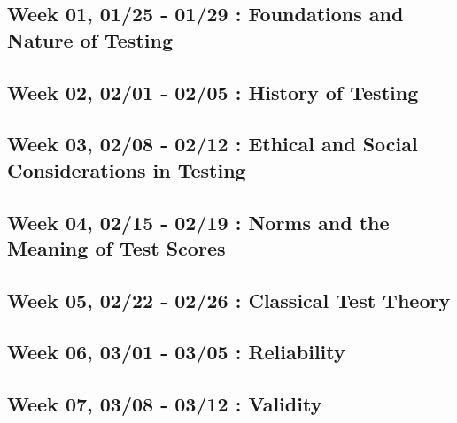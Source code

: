 \documentclass[11pt,]{article}
\begin{document}
\hypertarget{week-01-0125---0129-foundations-and-nature-of-testing}{%
\subsection{Week 01, 01/25 - 01/29 : Foundations and Nature of
Testing}\label{week-01-0125---0129-foundations-and-nature-of-testing}}

\hypertarget{week-02-0201---0205-history-of-testing}{%
\subsection{Week 02, 02/01 - 02/05 : History of
Testing}\label{week-02-0201---0205-history-of-testing}}

\hypertarget{week-03-0208---0212-ethical-and-social-considerations-in-testing}{%
\subsection{Week 03, 02/08 - 02/12 : Ethical and Social Considerations
in
Testing}\label{week-03-0208---0212-ethical-and-social-considerations-in-testing}}

\hypertarget{week-04-0215---0219-norms-and-the-meaning-of-test-scores}{%
\subsection{Week 04, 02/15 - 02/19 : Norms and the Meaning of Test
Scores}\label{week-04-0215---0219-norms-and-the-meaning-of-test-scores}}

\hypertarget{week-05-0222---0226-classical-test-theory}{%
\subsection{Week 05, 02/22 - 02/26 : Classical Test
Theory}\label{week-05-0222---0226-classical-test-theory}}

\hypertarget{week-06-0301---0305-reliability}{%
\subsection{Week 06, 03/01 - 03/05 :
Reliability}\label{week-06-0301---0305-reliability}}

\hypertarget{week-07-0308---0312-validity}{%
\subsection{Week 07, 03/08 - 03/12 :
Validity}\label{week-07-0308---0312-validity}}
\end{document}
